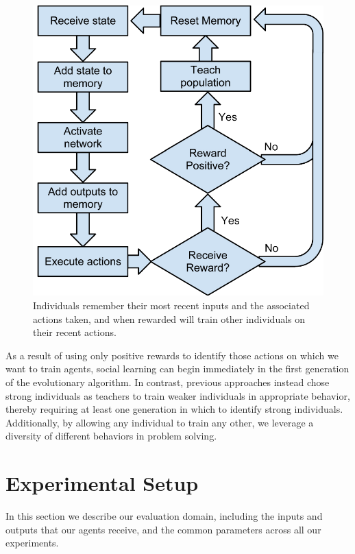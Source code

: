 \documentclass{acm_proc_article-sp}
\begin{document}
\begin{figure}
  \centering
    \includegraphics[scale=.6]{flowchart.pdf}
  \caption{Individuals remember their most recent inputs and the associated actions taken, and when rewarded will train other individuals on their recent actions.}
  \label{fig:flowchart}
\end{figure}


As a result of using only positive rewards to identify those actions on which we want to train agents, social learning can begin immediately in the first generation of the evolutionary algorithm. In contrast, previous approaches \cite{denaro1996cultural} instead chose strong individuals as teachers to train weaker individuals in appropriate behavior, thereby requiring at least one generation in which to identify strong individuals. Additionally, by allowing any individual to train any other, we leverage a diversity of different behaviors in problem solving.

\section{Experimental Setup}
\label{sec:setup}
In this section we describe our evaluation domain, including the inputs and outputs that our agents receive, and the common parameters across all our experiments.
\end{document}
